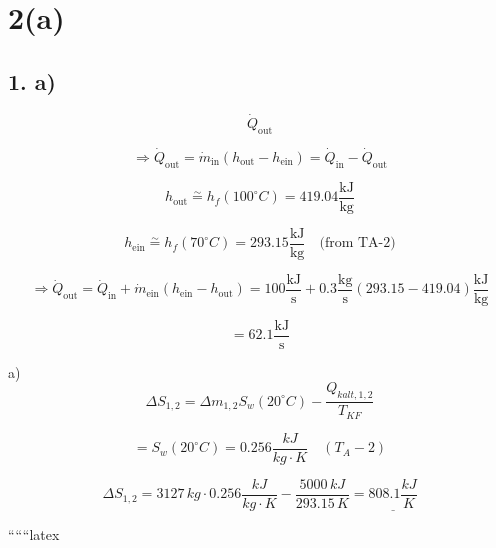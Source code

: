 \section*{2(a)}

\subsection*{1. a)}

\[
\dot{Q}_{\text{out}}
\]

\[
\Rightarrow \dot{Q}_{\text{out}} = \dot{m}_{\text{in}} (h_{\text{out}} - h_{\text{ein}}) = \dot{Q}_{\text{in}} - \dot{Q}_{\text{out}}
\]

\[
h_{\text{out}} \overset{\sim}{=} h_f (100^\circ C) = 419.04 \frac{\text{kJ}}{\text{kg}}
\]

\[
h_{\text{ein}} \overset{\sim}{=} h_f (70^\circ C) = 293.15 \frac{\text{kJ}}{\text{kg}} \quad \text{(from TA-2)}
\]

\[
\Rightarrow \dot{Q}_{\text{out}} = \dot{Q}_{\text{in}} + \dot{m}_{\text{ein}} (h_{\text{ein}} - h_{\text{out}}) = 100 \frac{\text{kJ}}{\text{s}} + 0.3 \frac{\text{kg}}{\text{s}} (293.15 - 419.04) \frac{\text{kJ}}{\text{kg}}
\]

\[
= 62.1 \frac{\text{kJ}}{\text{s}}
\]

a) 
\[
\Delta S_{1,2} = \Delta m_{1,2} S_w (20^\circ C) - \frac{Q_{kalt,1,2}}{T_{KF}}
\]

\[
= S_w (20^\circ C) = 0.256 \frac{kJ}{kg \cdot K} \quad (T_A - 2)
\]

\[
\Delta S_{1,2} = 3127 \, kg \cdot 0.256 \frac{kJ}{kg \cdot K} - \frac{5000 \, kJ}{293.15 \, K} = \underline{808.1 \frac{kJ}{K}}
\]

``````latex